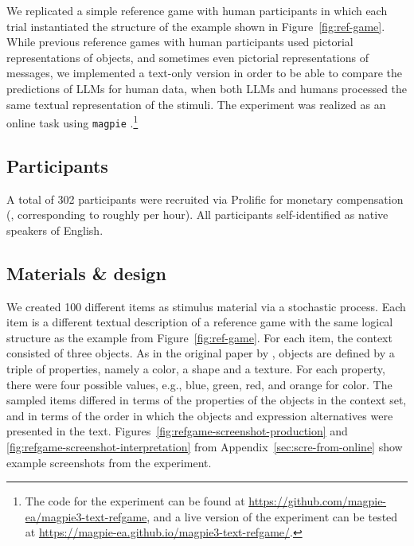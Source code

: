 \documentclass[fleqn]{article}
\begin{document}
We replicated a simple reference game with human participants in which each trial instantiated the structure of the example shown in Figure~\ref{fig:ref-game}.
While previous reference games with human participants used pictorial representations of objects, and sometimes even pictorial representations of messages, we implemented a text-only version in order to be able to compare the predictions of LLMs for human data, when both LLMs and humans processed the same textual representation of the stimuli.
The experiment was realized as an online task using \texttt{magpie} \citep{FrankeJi:magpie:-Minimal}.\footnote{
  The code for the experiment can be found at \href{https://github.com/magpie-ea/magpie3-text-refgame}{https://github.com/magpie-ea/magpie3-text-refgame}, and a live version of the experiment can be tested at \href{https://magpie-ea.github.io/magpie3-text-refgame/}{https://magpie-ea.github.io/magpie3-text-refgame/}.
}


\subsection{Participants}
\label{participants}

A total of 302 participants were recruited via Prolific for monetary
compensation (, corresponding to roughly  per hour).
All participants self-identified as native speakers of English.

\subsection{Materials \& design}
\label{materials-design}

We created 100 different items as stimulus material via a stochastic process.
Each item is a different textual description of a reference game with the same logical structure as the example from Figure~\ref{fig:ref-game}.
For each item, the context consisted of three objects.
As in the original paper by \citet{FrankGoodman2012:Predicting-Prag}, objects are defined by a triple of properties, namely a color, a shape and a texture.
For each property, there were four possible values, e.g., blue, green, red, and orange for color.
The sampled items differed in terms of the properties of the objects in the context set, and in terms of the order in which the objects and expression alternatives were presented in the text.
Figures~\ref{fig:refgame-screenshot-production} and \ref{fig:refgame-screenshot-interpretation} from Appendix~\ref{sec:scre-from-online} show example screenshots from the experiment.
\end{document}
